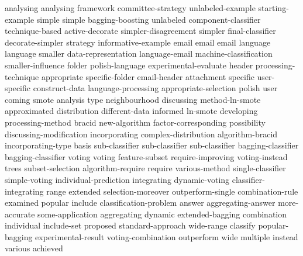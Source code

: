 analysing	analysing	
framework	
committee-strategy	
unlabeled-example	
starting-example	
simple	simple	
bagging-boosting	
unlabeled	
component-classifier	
technique-based	
active-decorate	
simpler-disagreement	
simpler	
final-classifier	
decorate-simpler	
strategy	
informative-example	
email	email	email	
language	language	
smaller	
data-representation	
language-email	
machine-classification	
smaller-influence	
folder	
polish-language	
experimental-evaluate	
header	
processing-technique	
appropriate	
specific-folder	
email-header	
attachment	
specific	
user-specific	
construct-data	
language-processing	
appropriate-selection	
polish	
user	
coming	
smote	
analysis	
type	
neighbourhood	
discussing	
method-ln-smote	
approximated	
distribution	
different-data	
informed	
ln-smote	
developing	
processing-method	
bracid	
new-algorithm	
factor-corresponding	
possibility	
discussing-modification	
incorporating	
complex-distribution	
algorithm-bracid	
incorporating-type	
basis	
sub-classifier	sub-classifier	sub-classifier	
bagging-classifier	bagging-classifier	
voting	voting	
feature-subset	
require-improving	
voting-instead	
trees	
subset-selection	
algorithm-require	
require	
various-method	
single-classifier	
simple-voting	
individual-prediction	
integrating	
dynamic-voting	
classifier-integrating	
range	
extended	
selection-moreover	
outperform-single	
combination-rule	
examined	
popular	
include	
classification-problem	
answer	
aggregating-answer	
more-accurate	
some-application	
aggregating	
dynamic	
extended-bagging	
combination	
individual	
include-set	
proposed	
standard-approach	
wide-range	
classify	
popular-bagging	
experimental-result	
voting-combination	
outperform	
wide	
multiple	
instead	
various	
achieved	
